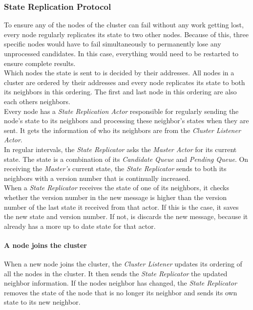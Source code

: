 \subsubsection{State Replication Protocol}\label{protocol:stateReplication}
To ensure any of the nodes of the cluster can fail without any work getting lost, every node regularly replicates its state to two other nodes.
Because of this, three specific nodes would have to fail simultaneously to permanently lose any unprocessed candidates. 
In this case, everything would need to be restarted to ensure complete results. \\
Which nodes the state is sent to is decided by their addresses.
All nodes in a cluster are ordered by their addresses and every node replicates its state to both its neighbors in this ordering.
The first and last node in this ordering are also each others neighbors.\\
Every node has a \emph{State Replication Actor} responsible for regularly sending the node's state to its neighbors and processing these neighbor's states when they are sent.
It gets the information of who its neighbors are from the \emph{Cluster Listener Actor}. \\
In regular intervals, the \emph{State Replicator} asks the \emph{Master Actor} for its current state.
The state is a combination of its \emph{Candidate Queue} and \emph{Pending Queue}.
On receiving the \emph{Master's} current state, the \emph{State Replicator} sends to both its neighbors with a version number that is continually increased.\\
When a \emph{State Replicator} receives the state of one of its neighbors, it checks whether the version number in the new message is higher than the version number of the last state it received from that actor.
If this is the case, it saves the new state and version number.
If not, is discards the new message, because it already has a more up to date state for that actor.

\paragraph{A node joins the cluster}
When a new node joins the cluster, the \emph{Cluster Listener} updates its ordering of all the nodes in the cluster. 
It then sends the \emph{State Replicator} the updated neighbor information.
If the nodes neighbor has changed, the \emph{State Replicator} removes the state of the node that is no longer its neighbor and sends its own state to its new neighbor.

